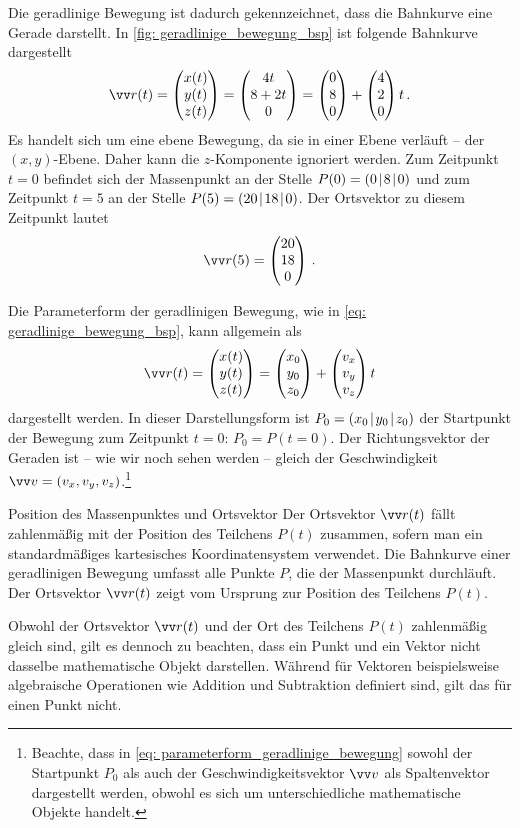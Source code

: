 Die geradlinige Bewegung ist dadurch gekennzeichnet, dass die Bahnkurve eine Gerade darstellt. In \cref{fig: geradlinige_bewegung_bsp} ist folgende Bahnkurve dargestellt
\begin{equation}\label{eq: geradlinige_bewegung_bsp}
    \ivec{r}(t) = \icolThree{x(t)}{y(t)}{z(t)} = \icolThree{4t}{8+2t}{0} = \icolThree{0}{8}{0} + \icolThree{4}{2}{0} t \mDot
\end{equation}
Es handelt sich um eine ebene Bewegung, da sie in einer Ebene verläuft -- der $(x,y)$-Ebene. Daher kann die $z$-Komponente ignoriert werden.
Zum Zeitpunkt $t=0$ befindet sich der Massenpunkt an der Stelle $P(0) = (0\!\mid\! 8\!\mid\! 0)$ und zum Zeitpunkt $t = 5$ an der Stelle $P(5) = (20\!\mid\! 18\!\mid\! 0)$. Der Ortsvektor zu diesem Zeitpunkt lautet
\begin{equation}
    \ivec{r}(5) = \icolThree{20}{18}{0} \mDot
\end{equation}

Die Parameterform der geradlinigen Bewegung, wie in \cref{eq: geradlinige_bewegung_bsp}, kann allgemein als
\begin{equation}\label{eq: parameterform_geradlinige_bewegung}
    \ivec{r}(t) = \icolThree{x(t)}{y(t)}{z(t)} = \icolThree{x_0}{y_0}{z_0} + \icolThree{v_x}{v_y}{v_z} t
\end{equation}
dargestellt werden. In dieser Darstellungsform ist $P_0 = (x_0\!\mid\! y_0\!\mid\! z_0)$ der Startpunkt der Bewegung zum Zeitpunkt $t = 0$: $P_0 = P(t=0)$. Der Richtungsvektor der Geraden ist -- wie wir noch sehen werden -- gleich der Geschwindigkeit $\ivec{v} = \inlrowThree{v_x}{v_y}{v_z}$.\footnote{Beachte, dass in \cref{eq: parameterform_geradlinige_bewegung} sowohl der Startpunkt $P_0$ als auch der Geschwindigkeitsvektor $\ivec{v}$ als Spaltenvektor dargestellt werden, obwohl es sich um unterschiedliche mathematische Objekte handelt.}

\begin{rememberbox}{Position des Massenpunktes und Ortsvektor}
    Der Ortsvektor $\ivec{r}(t)$ fällt zahlenmäßig mit der Position des Teilchens $P(t)$ zusammen, sofern man ein standardmäßiges kartesisches Koordinatensystem verwendet.
    Die Bahnkurve einer geradlinigen Bewegung umfasst alle Punkte $P$, die der Massenpunkt durchläuft. Der Ortsvektor $\ivec{r}(t)$ zeigt vom Ursprung zur Position des Teilchens $P(t)$.
\end{rememberbox}
Obwohl der Ortsvektor $\ivec{r}(t)$ und der Ort des Teilchens $P(t)$ zahlenmäßig gleich sind, gilt es dennoch zu beachten, dass ein Punkt und ein Vektor nicht dasselbe mathematische Objekt darstellen. Während für Vektoren beispielsweise algebraische Operationen wie Addition und Subtraktion definiert sind, gilt das für einen Punkt nicht. 

